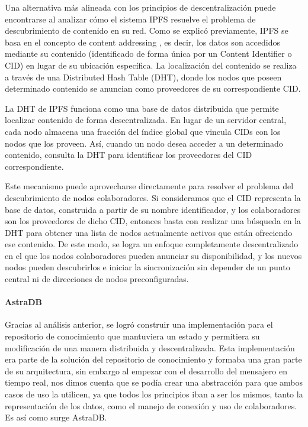 Una alternativa más alineada con los principios de descentralización puede encontrarse al analizar cómo el sistema IPFS resuelve el problema de descubrimiento de contenido en su red. Como se explicó previamente, IPFS se basa en el concepto de content addressing \cite{content-addressing}, es decir, los datos son accedidos mediante su contenido (identificado de forma única por un Content Identifier o CID) en lugar de su ubicación específica. La localización del contenido se realiza a través de una Distributed Hash Table (DHT), donde los nodos que poseen determinado contenido se anuncian como proveedores de su correspondiente CID.

La DHT de IPFS funciona como una base de datos distribuida que permite localizar contenido de forma descentralizada. En lugar de un servidor central, cada nodo almacena una fracción del índice global que vincula CIDs con los nodos que los proveen. Así, cuando un nodo desea acceder a un determinado contenido, consulta la DHT para identificar los proveedores del CID correspondiente.\cite{dht}

Este mecanismo puede aprovecharse directamente para resolver el problema del descubrimiento de nodos colaboradores. Si consideramos que el CID representa la base de datos, construida a partir de su nombre identificador, y los colaboradores son los proveedores de dicho CID, entonces basta con realizar una búsqueda en la DHT para obtener una lista de nodos actualmente activos que están ofreciendo ese contenido. De este modo, se logra un enfoque completamente descentralizado en el que los nodos colaboradores pueden anunciar su disponibilidad, y los nuevos nodos pueden descubrirlos e iniciar la sincronización sin depender de un punto central ni de direcciones de nodos preconfiguradas.

\paragraph{AstraDB}

Gracias al análisis anterior, se logró construir una implementación para el repositorio de conocimiento que mantuviera un estado y permitiera su modificación de una manera distribuida y descentralizada. Esta implementación era parte de la solución del repositorio de conocimiento y formaba una gran parte de su arquitectura, sin embargo al empezar con el desarrollo del mensajero en tiempo real, nos dimos cuenta que se podía crear una abstracción para que ambos casos de uso la utilicen, ya que todos los principios iban a ser los mismos, tanto la representación de los datos, como el manejo de conexión y uso de colaboradores. Es así como surge AstraDB.

